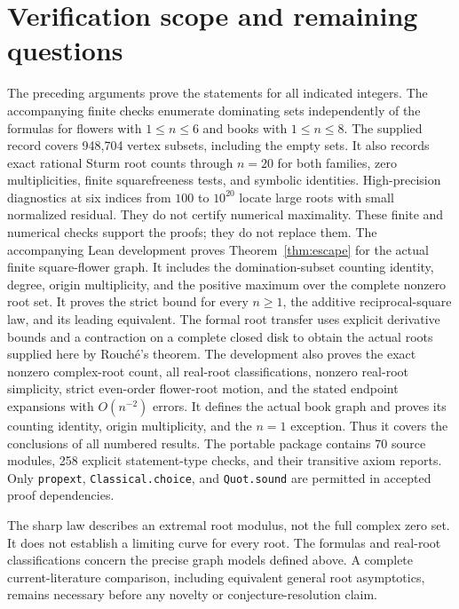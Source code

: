 \documentclass[11pt,a4paper]{article}
\begin{document}
\section{Verification scope and remaining questions}\label{sec:verification}
The preceding arguments prove the statements for all indicated integers.
The accompanying finite checks enumerate dominating sets independently of
the formulas for flowers with $1\le n\le6$ and books with $1\le n\le8$.
The supplied record covers 948,704 vertex subsets, including the empty sets.
It also records exact rational Sturm root counts through $n=20$ for both
families, zero multiplicities, finite squarefreeness tests, and symbolic identities.
High-precision diagnostics at six indices from $100$ to $10^{20}$ locate large
roots with small normalized residual. They do not certify numerical maximality.
These finite and numerical checks support the proofs; they do not replace them.
The accompanying Lean development proves Theorem~\ref{thm:escape} for the
actual finite square-flower graph. It includes the domination-subset counting
identity, degree, origin multiplicity, and the positive maximum over the
complete nonzero root set. It proves the strict bound for every $n\ge1$,
the additive reciprocal-square law, and its leading equivalent.
The formal root transfer uses explicit derivative bounds and a contraction
on a complete closed disk to obtain the actual roots supplied here by
Rouch\'e's theorem. The development also proves the exact nonzero complex-root
count, all real-root classifications, nonzero real-root simplicity, strict
even-order flower-root motion, and the stated endpoint expansions with
$O(n^{-2})$ errors. It defines the actual book graph and proves its counting
identity, origin multiplicity, and the $n=1$ exception. Thus it covers the
conclusions of all numbered results. The portable package contains 70 source
modules, 258 explicit statement-type checks, and their transitive axiom reports.
Only \texttt{propext}, \texttt{Classical.choice}, and \texttt{Quot.sound}
are permitted in accepted proof dependencies.

The sharp law describes an extremal root modulus, not the full complex zero
set. It does not establish a limiting curve for every root. The formulas and
real-root classifications concern the precise graph models defined above.
A complete current-literature comparison, including equivalent general root
asymptotics, remains necessary before any novelty or conjecture-resolution claim.
\end{document}
